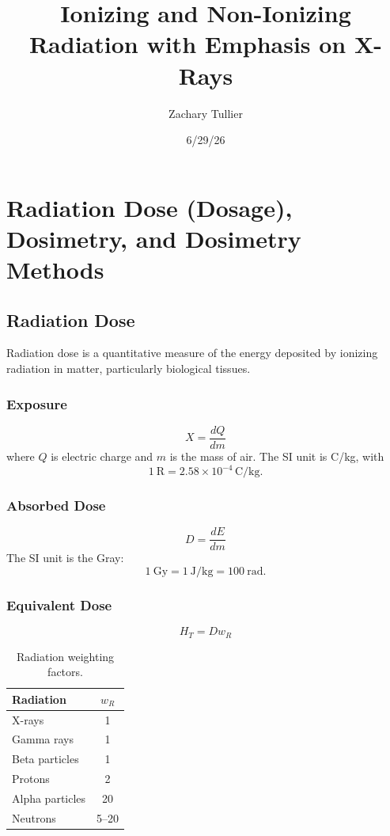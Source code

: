 \documentclass[12pt]{article}
\title{Ionizing and Non-Ionizing Radiation with Emphasis on X-Rays}
\author{Zachary Tullier}
\date{6/29/26}
\begin{document}
\maketitle
\section{Radiation Dose (Dosage), Dosimetry, and Dosimetry Methods}

\subsection{Radiation Dose}
Radiation dose is a quantitative measure of the energy deposited by ionizing radiation in matter, particularly biological tissues.

\subsubsection{Exposure}
\begin{equation}
X=\frac{dQ}{dm}
\end{equation}
where $Q$ is electric charge and $m$ is the mass of air. The SI unit is C/kg, with
\[
1~\mathrm{R}=2.58\times10^{-4}\,\mathrm{C/kg}.
\]

\subsubsection{Absorbed Dose}
\begin{equation}
D=\frac{dE}{dm}
\end{equation}
The SI unit is the Gray:
\[
1~\mathrm{Gy}=1~\mathrm{J/kg}=100~\mathrm{rad}.
\]

\subsubsection{Equivalent Dose}
\begin{equation}
H_T=Dw_R
\end{equation}

\begin{table}[h]
\centering
\begin{tabular}{lc}
\hline
Radiation & $w_R$\\ \hline
X-rays & 1\\
Gamma rays & 1\\
Beta particles & 1\\
Protons & 2\\
Alpha particles & 20\\
Neutrons & 5--20\\
\hline
\end{tabular}
\caption{Radiation weighting factors.}
\end{table}
\end{document}
